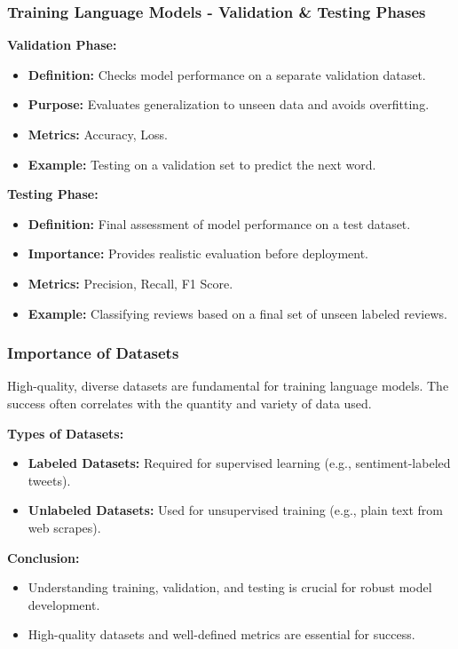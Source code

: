 \documentclass[aspectratio=169]{beamer}
\begin{document}
\begin{frame}[fragile]
    \frametitle{Training Language Models - Validation \& Testing Phases}
    
    \textbf{Validation Phase:}
    \begin{itemize}
        \item \textbf{Definition:} Checks model performance on a separate validation dataset.
        \item \textbf{Purpose:} Evaluates generalization to unseen data and avoids overfitting.
        \item \textbf{Metrics:} Accuracy, Loss.
        \item \textbf{Example:} Testing on a validation set to predict the next word.
    \end{itemize}
    
    \textbf{Testing Phase:}
    \begin{itemize}
        \item \textbf{Definition:} Final assessment of model performance on a test dataset.
        \item \textbf{Importance:} Provides realistic evaluation before deployment.
        \item \textbf{Metrics:} Precision, Recall, F1 Score.
        \item \textbf{Example:} Classifying reviews based on a final set of unseen labeled reviews.
    \end{itemize}
\end{frame}

\begin{frame}[fragile]
    \frametitle{Importance of Datasets}
    
    High-quality, diverse datasets are fundamental for training language models. The success often correlates with the quantity and variety of data used.
    
    \textbf{Types of Datasets:}
    \begin{itemize}
        \item \textbf{Labeled Datasets:} Required for supervised learning (e.g., sentiment-labeled tweets).
        \item \textbf{Unlabeled Datasets:} Used for unsupervised training (e.g., plain text from web scrapes).
    \end{itemize}
    
    \textbf{Conclusion:}
    \begin{itemize}
        \item Understanding training, validation, and testing is crucial for robust model development.
        \item High-quality datasets and well-defined metrics are essential for success.
    \end{itemize}
\end{frame}
\end{document}
